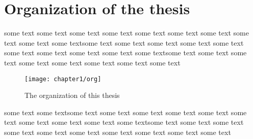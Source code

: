 \section{Organization of the thesis}
\label{sec:organization}

some text some text some text some text some text some text some text
some text some text some textsome text some text some text some text
some text some text some text some text some text some textsome text
some text some text some text some text some text some text some text
\begin{figure}
  \centering
  \texttt{[image: chapter1/org]}
  \caption{The organization of this thesis}
  \label{fig:organization-1}
\end{figure}
some text some textsome text some text some text some text some text
some text some text some text some text some textsome text some text
some text some text some text some text some text some text some text
some text

